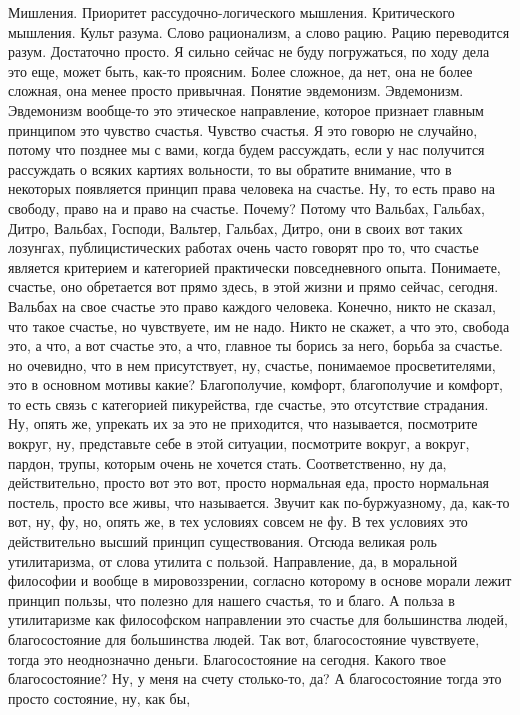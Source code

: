 Мишления. Приоритет рассудочно-логического мышления. Критического мышления.
Культ разума. Слово рационализм, а слово рацию. Рацию переводится разум.
Достаточно просто. Я сильно сейчас не буду погружаться, по ходу дела это еще,
может быть, как-то проясним. Более сложное, да нет, она не более сложная, она
менее просто привычная. Понятие эвдемонизм. Эвдемонизм. Эвдемонизм вообще-то это
этическое направление, которое признает главным принципом это чувство счастья.
Чувство счастья. Я это говорю не случайно, потому что позднее мы с вами, когда
будем рассуждать, если у нас получится рассуждать о всяких картиях вольности, то
вы обратите внимание, что в некоторых появляется принцип права человека на
счастье. Ну, то есть право на свободу, право на и право на счастье. Почему?
Потому что Вальбах, Гальбах, Дитро, Вальбах, Господи, Вальтер, Гальбах, Дитро,
они в своих вот таких лозунгах, публицистических работах очень часто говорят про
то, что счастье является критерием и категорией практически повседневного опыта.
Понимаете, счастье, оно обретается вот прямо здесь, в этой жизни и прямо сейчас,
сегодня. Вальбах на свое счастье это право каждого человека. Конечно, никто не
сказал, что такое счастье, но чувствуете, им не надо. Никто не скажет, а что
это, свобода это, а что, а вот счастье это, а что, главное ты борись за него,
борьба за счастье. но очевидно, что в нем присутствует, ну, счастье, понимаемое
просветителями, это в основном мотивы какие? Благополучие, комфорт, благополучие
и комфорт, то есть связь с категорией пикурейства, где счастье, это отсутствие
страдания. Ну, опять же, упрекать их за это не приходится, что называется,
посмотрите вокруг, ну, представьте себе в этой ситуации, посмотрите вокруг, а
вокруг, пардон, трупы, которым очень не хочется стать. Соответственно, ну да,
действительно, просто вот это вот, просто нормальная еда, просто нормальная
постель, просто все живы, что называется. Звучит как по-буржуазному, да, как-то
вот, ну, фу, но, опять же, в тех условиях совсем не фу. В тех условиях это
действительно высший принцип существования. Отсюда великая роль утилитаризма, от
слова утилита с пользой. Направление, да, в моральной философии и вообще в
мировоззрении, согласно которому в основе морали лежит принцип пользы, что
полезно для нашего счастья, то и благо. А польза в утилитаризме как философском
направлении это счастье для большинства людей, благосостояние для большинства
людей. Так вот, благосостояние чувствуете, тогда это неоднозначно деньги.
Благосостояние на сегодня. Какого твое благосостояние? Ну, у меня на счету
столько-то, да? А благосостояние тогда это просто состояние, ну, как бы,
